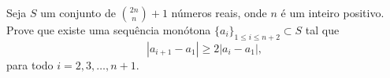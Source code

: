 Seja \(S\) um conjunto de \(\binom{2n}{n} + 1\) números reais, onde \(n\) é um inteiro positivo. Prove que existe uma sequência monótona \(\{a_i\}_{1\leq i \leq n+2} \subset S\) tal que
\[ |a_{i+1} - a_1 | \geq 2 | a_i - a_1 | , \]
para todo \(i=2,3,\ldots, n+1\).
